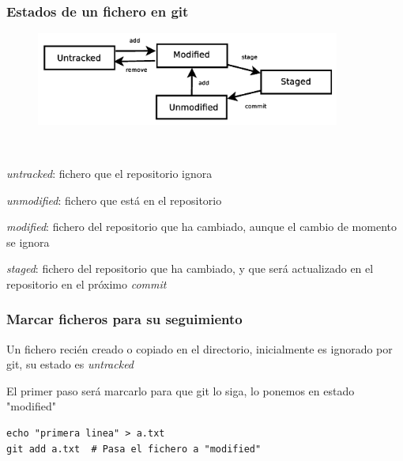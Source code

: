 \documentclass[ucs]{beamer}
\begin{document}
\begin{frame}[fragile]
\frametitle{Estados de un fichero en git}
\begin{minipage}{7cm}
\begin{figure}
\begin{center}
\includegraphics[width=10cm]{figs/estados_git}
\end{center}
\end{figure}
\begin{tiny}
\begin{flushright}
\end{flushright}
\end{tiny}

\end{minipage} \hfill
\

\begin{itemize}
\begin{small}
\item
\emph{untracked}: fichero que el repositorio ignora
\item
\emph{unmodified}: fichero que está en el repositorio
\item
\emph{modified}: fichero del repositorio que ha cambiado, aunque el cambio de momento se ignora
\item
\emph{staged}: fichero del repositorio que ha cambiado, y que será actualizado en el repositorio
en el próximo \emph{commit}
\end{small}
\end{itemize}
\end{frame}


\begin{frame}[fragile]
\frametitle{Marcar ficheros para su seguimiento}
Un fichero recién creado o copiado en el directorio, inicialmente
es ignorado por git, su estado es \emph{untracked}

El primer paso será marcarlo para que git lo siga, lo ponemos
en estado "modified"

  \begin{footnotesize}
  \begin{verbatim}
echo "primera linea" > a.txt  
git add a.txt  # Pasa el fichero a "modified"
  \end{verbatim}
  \end{footnotesize}

\end{frame}
\end{document}
